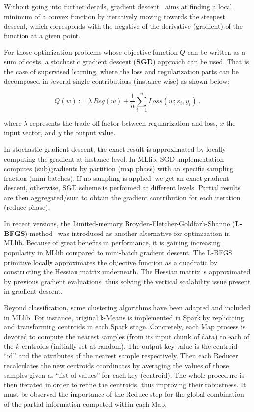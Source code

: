 \documentclass[3p,review]{elsarticle}
\begin{document}
Without going into further details, gradient descent~\cite{hastie11} aims at finding a local minimum of a convex function by iteratively moving towards the steepest descent, which corresponds with the negative of the derivative (gradient) of the function at a given point. 

For those optimization problems whose objective function $Q$ can be written as a sum of costs, a stochastic gradient descent (\textbf{SGD}) approach can be used. That is the case of supervised learning, where the loss and regularization parts can be decomposed in several single contributions (instance-wise) as shown below:

\begin{equation}
    Q(w) := 
    \lambda\, Reg(w) +
    \frac1n \sum_{i=1}^n Loss(w;x_i,y_i) 
    \label{eq:regPrimal}
    \ .
\end{equation}

\noindent where $\lambda$ represents the trade-off factor between regularization and loss, $x$ the input vector, and $y$ the output value.

In stochastic gradient descent, the exact result is approximated by locally computing the gradient at instance-level. In MLlib, SGD implementation computes (sub)gradients by partition (map phase) with an specific sampling fraction (mini-batches). If no sampling is applied, we get an exact gradient descent, otherwise, SGD scheme is performed at different levels. Partial results are then aggregated/sum to obtain the gradient contribution for each iteration (reduce phase).  

In recent versions, the Limited-memory Broyden-Fletcher-Goldfarb-Shanno (\textbf{L-BFGS}) method~\cite{liu89} was introduced as another alternative for optimization in MLlib. Because of great benefits in performance, it is gaining increasing popularity in MLlib compared to mini-batch gradient descent. The L-BFGS primitive locally approximates the objective function as a quadratic by constructing the Hessian matrix underneath. The Hessian matrix is approximated by previous gradient evaluations, thus solving the vertical scalability issue present in gradient descent.


Beyond classification, some clustering algorithms have been adapted and included in MLlib. For instance, original k-Means is implemented in Spark by replicating and transforming centroids in each Spark stage. Concretely, each Map process is devoted to compute the nearest samples (from its input chunk of data) to each of the $k$ centroids (initially set at random). The output key-value is the centroid ``id'' and the attributes of the nearest sample respectively. Then each Reducer recalculates the new centroids coordinates by averaging the values of those samples given as ``list of values'' for each key (centroid). The whole procedure is then iterated in order to refine the centroids, thus improving their robustness. It must be observed the importance of the Reduce step for the global combination of the partial information computed within each Map.  
\end{document}
